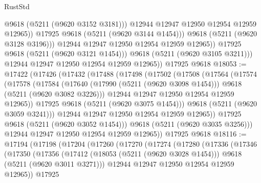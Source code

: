 \begin{lexlean}{RustStd}
\begin{coremodule}
                          @9618
                          (@5211 (@9620 @3152 @3181)))
                        @12944
                        @12947
                        @12950
                        @12954
                        @12959
                        @12965))
                    @17925
                    @9618
                    (@5211 (@9620 @3144 @1454)))
                  @9618
                  (@5211 (@9620 @3128 @3196)))
                @12944
                @12947
                @12950
                @12954
                @12959
                @12965))
            @17925
            @9618
            (@5211 (@9620 @3121 @1454)))
          @9618
          (@5211 (@9620 @3105 @3211)))
        @12944
        @12947
        @12950
        @12954
        @12959
        @12965))
    @17925
    @9618
@18053 := @17422
    (@17426
      (@17432
        (@17488
          (@17498
            (@17502
              (@17508
                (@17564
                  (@17574
                    (@17578
                      (@17584
                        (@17640
                          (@17990 (@5211 (@9620 @3098 @1454)))
                          @9618
                          (@5211 (@9620 @3082 @3226)))
                        @12944
                        @12947
                        @12950
                        @12954
                        @12959
                        @12965))
                    @17925
                    @9618
                    (@5211 (@9620 @3075 @1454)))
                  @9618
                  (@5211 (@9620 @3059 @3241)))
                @12944
                @12947
                @12950
                @12954
                @12959
                @12965))
            @17925
            @9618
            (@5211 (@9620 @3052 @1454)))
          @9618
          (@5211 (@9620 @3035 @3256)))
        @12944
        @12947
        @12950
        @12954
        @12959
        @12965))
    @17925
    @9618
@18116 := @17194
    (@17198
      (@17204
        (@17260
          (@17270
            (@17274
              (@17280
                (@17336
                  (@17346
                    (@17350
                      (@17356
                        (@17412
                          (@18053 (@5211 (@9620 @3028 @1454)))
                          @9618
                          (@5211 (@9620 @3011 @3271)))
                        @12944
                        @12947
                        @12950
                        @12954
                        @12959
                        @12965))
                    @17925

\end{coremodule}
\end{lexlean}
